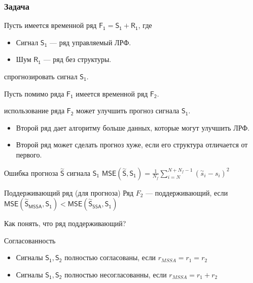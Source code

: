 \documentclass{beamer}
\begin{document}
    \begin{frame}
        \frametitle{Задача}

        Пусть имеется временной ряд $\mathsf{F_1 = S_1 + R_1}$, где
        \begin{itemize}
            \item Сигнал $\mathsf{S_1}$ --- ряд управляемый ЛРФ.
            \item Шум $\mathsf{R_1}$ --- ряд без структуры.
        \end{itemize} 

        спрогнозировать сигнал $\mathsf{S_1}$.

        Пусть помимо ряда $\mathsf{F_1}$ имеется временной ряд $\mathsf{F_2}$.

        использование ряда $\mathsf{F_2}$ может улучшить прогноз сигнала $\mathsf{S_1}$.

        \begin{itemize}
            \item Второй ряд дает алгоритму больше данных, которые могут улучшить ЛРФ.
            \item Второй ряд может сделать прогноз хуже, если его структура отличается от первого.
        \end{itemize}
    \end{frame}
    
    \begin{frame}
        \begin{block}{Ошибка прогноза $\overset{\sim}{\mathsf{S}}$ сигнала $\mathsf{S_1}$}
            $\mathsf{MSE(\overset{\sim}{S}, S_1)} = \frac{1}{N_{f}} \sum_{i = N}^{N + N_{f} - 1} (\overset{\sim}{s}_i - s_i)^2$
        \end{block}

        \begin{block}{Поддерживающий ряд (для прогноза)}
            Ряд $F_2$ --- поддерживающий, если $\mathsf{MSE(\overset{\sim}{S}_{MSSA}, S_1)} < \mathsf{MSE(\overset{\sim}{S}_{SSA}, S_1)}$
        \end{block}

         Как понять, что ряд поддерживающий? 

        \begin{block}{Согласованность}
            \begin{itemize}
                \item Сигналы $\mathsf{S_1, S_2}$ полностью согласованы, если $r_{MSSA} = r_1 = r_2$
                \item Сигналы $\mathsf{S_1, S_2}$ полностью несогласованны, если $r_{MSSA} = r_1 + r_2$
            \end{itemize}
        \end{block}

    \end{frame}
\end{document}
